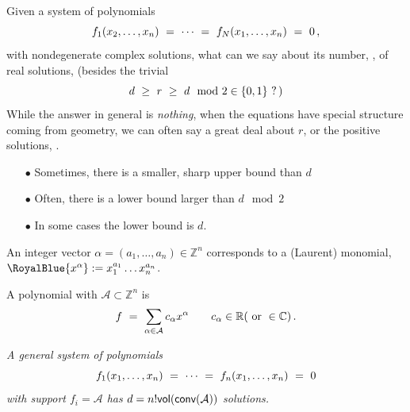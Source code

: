 \documentclass[17pt,landscape]{Narrow}
\newcommand{\DeCo}{\RoyalBlue}
\newcommand{\conv}{\mbox{\sf conv}}
\newcommand{\vol}{\mbox{\sf vol}}
\newcommand{\C}{{\mathbb C}}
\newcommand{\R}{{\mathbb R}}
\newcommand{\Z}{{\mathbb Z}}
\newcommand{\calA}{{\mathcal A}}
\begin{document}
\setcounter{page}{0}
\begin{flushleft}
\slide{}
\LogoOn
\begin{center}
\end{center}

Given a system of polynomials\vspace{-8pt}
\[
   f_1(x_2,\dotsc,x_n)\ =\  \dotsb\ =\ f_N(x_1,\dotsc,x_n)\ =\ 0\,,\vspace{-8pt}
\]
with \DeCo{$d$} nondegenerate complex solutions, what can we say about its number, 
\DeCo{$r$}, of real solutions, (besides the trivial\vspace{-8pt}
\[
    d\ \geq\ r\ \geq\ d\mod 2 \in\{0,1\}\ ?\,)\vspace{-8pt}
\]
While the answer in general is {\sl nothing}, when the equations have special structure
coming from geometry, we can often say a great deal about $r$,
or the positive solutions, \DeCo{$r_+$}.\vspace{-8pt}

\begin{itemize}
 \item[$\bullet$] Sometimes, there is a smaller, sharp upper bound than $d$
 \item[$\bullet$] Often, there is a lower bound larger than $d\mod 2$
 \item[$\bullet$] In some cases the lower bound is $d$.\vspace{-8pt}
\end{itemize}


\slide{}
\LogoOn
\begin{center}
\end{center}

\noindent
An integer vector $\alpha=(a_1,\dotsc,a_n)\in\Z^n$ \newline
corresponds to a (Laurent) monomial, $\DeCo{x^\alpha}:= x_1^{a_1} \dotsc x_n^{a_n}$.

A polynomial with \DeCo{support} $\calA\subset\Z^n$ is\vspace{-8pt}
\[
   f\ =\ \sum_{\alpha\in \calA} c_\alpha x^\alpha
   \qquad c_\alpha\in\R (\ \mbox{or}\ \in\C)\,.\vspace{-8pt}
\]

\noindent{}
{\sl 
 A general system of polynomials\vspace{-8pt}
\[
   f_1(x_1,\dotsc,x_n)\ =\ \dotsb\ =\ f_n(x_1,\dotsc,x_n)\ =\ 0\vspace{-8pt}
\]
with support $f_i=\calA$ has 
$d=n!\vol(\conv(\calA))$ solutions.
}


\end{flushleft}
\end{document}
